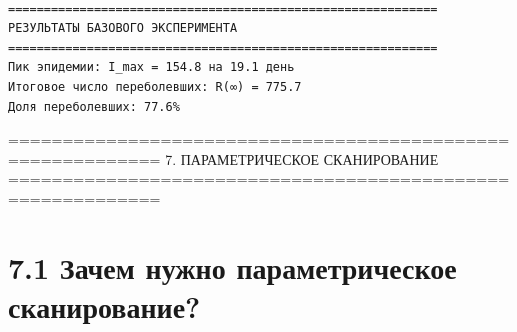 \documentclass[
  12pt,
  a4paper,
  DIV=11,
  numbers=noendperiod]{scrreprt}
\newenvironment{Shaded}{\begin{snugshade}}{\end{snugshade}}
\newcommand{\FloatTok}[1]{\textcolor[rgb]{0.68,0.00,0.00}{#1}}
\newcommand{\FunctionTok}[1]{\textcolor[rgb]{0.28,0.35,0.67}{#1}}
\newcommand{\KeywordTok}[1]{\textcolor[rgb]{0.00,0.23,0.31}{#1}}
\newcommand{\NormalTok}[1]{\textcolor[rgb]{0.00,0.23,0.31}{#1}}
\newcommand{\OperatorTok}[1]{\textcolor[rgb]{0.37,0.37,0.37}{#1}}
\newcommand{\SpecialCharTok}[1]{\textcolor[rgb]{0.37,0.37,0.37}{#1}}
\newcommand{\StringTok}[1]{\textcolor[rgb]{0.13,0.47,0.30}{#1}}
\begin{document}
\begin{Shaded}
\end{Shaded}

\begin{verbatim}

============================================================
РЕЗУЛЬТАТЫ БАЗОВОГО ЭКСПЕРИМЕНТА
============================================================
Пик эпидемии: I_max = 154.8 на 19.1 день
Итоговое число переболевших: R(∞) = 775.7
Доля переболевших: 77.6%
\end{verbatim}

============================================================ 7.
ПАРАМЕТРИЧЕСКОЕ СКАНИРОВАНИЕ
============================================================

\section{7.1 Зачем нужно параметрическое
сканирование?}\label{ux437ux430ux447ux435ux43c-ux43dux443ux436ux43dux43e-ux43fux430ux440ux430ux43cux435ux442ux440ux438ux447ux435ux441ux43aux43eux435-ux441ux43aux430ux43dux438ux440ux43eux432ux430ux43dux438ux435}
\end{document}
